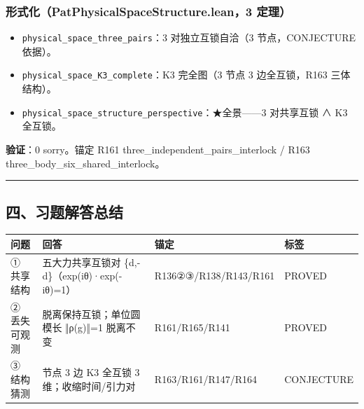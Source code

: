 \documentclass[
]{article}
\newcounter{none} %
\providecommand{\tightlist}{%
 \setlength{\itemsep}{0pt}\setlength{\parskip}{0pt}}
\begin{document}
\subsubsection{形式化（PatPhysicalSpaceStructure.lean，3
定理）}\label{ux5f62ux5f0fux5316patphysicalspacestructure.lean3-ux5b9aux7406}

\begin{itemize}
\tightlist
\item
 \texttt{physical\_space\_three\_pairs}：3 对独立互锁自洽（3
 节点，CONJECTURE 依据）。
\item
 \texttt{physical\_space\_K3\_complete}：K3 完全图（3 节点 3
 边全互锁，R163 三体结构）。
\item
 \texttt{physical\_space\_structure\_perspective}：★全景------3
 对共享互锁 ∧ K3 全互锁。
\end{itemize}

\textbf{验证}：0 sorry。锚定 R161 three\_independent\_pairs\_interlock /
R163 three\_body\_six\_shared\_interlock。

\begin{center}\rule{0.5\linewidth}{0.5pt}\end{center}

\subsection{四、习题解答总结}\label{ux56dbux4e60ux9898ux89e3ux7b54ux603bux7ed3}

{\def\LTcaptype{none} %
\begin{longtable}[]{@{}
 >{\raggedright\arraybackslash}p{}
 >{\raggedright\arraybackslash}p{}
 >{\raggedright\arraybackslash}p{}
 >{\raggedright\arraybackslash}p{}@{}}
\toprule\noalign{}
\begin{minipage}[b]{\linewidth}\raggedright
问题
\end{minipage} & \begin{minipage}[b]{\linewidth}\raggedright
回答
\end{minipage} & \begin{minipage}[b]{\linewidth}\raggedright
锚定
\end{minipage} & \begin{minipage}[b]{\linewidth}\raggedright
标签
\end{minipage} \\
\midrule\noalign{}
\endhead
\bottomrule\noalign{}
\endlastfoot
① 共享结构 & 五大力共享互锁对 \{d,-d\}（exp(iθ)·exp(-iθ)=1） &
R136②③/R138/R143/R161 & PROVED \\
② 丢失可观测 & 脱离保持互锁；单位圆模长 ‖ρ(g)‖=1 脱离不变 &
R161/R165/R141 & PROVED \\
③ 结构猜测 & 3 节点 3 边 K3 全互锁 3 维；收缩时间/引力对 &
R163/R161/R147/R164 & CONJECTURE \\
\end{longtable}
}
\end{document}
